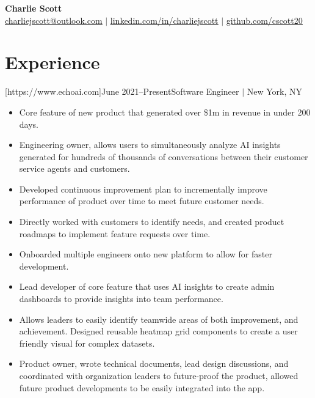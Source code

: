 \documentclass[letterpaper,11pt]{article}
\newcommand{\Item}[1]{
  \item\small{
    \parbox[t]{500pt}{\raggedright#1}
  }
}
\newenvironment{HeadingList}{
  \begin{mdframed}[
    topline=false,
    bottomline=false,
    rightline=false,
    leftline=false,
    linecolor=gray,
    linewidth=0pt,
    leftmargin=0pt,
    innerleftmargin=0pt,
    innertopmargin=0pt,
    innerbottommargin=0pt,
    innerrightmargin=0pt,
    skipabove=\parsep,
    skipbelow=\parsep,
  ]
  \begin{itemize}[leftmargin=0pt, label={}]
}{
  \end{itemize}
  \end{mdframed}
}
\newenvironment{SubHeadingList}{
  \begin{mdframed}[
    leftline=true,
    linecolor=gray,
    linewidth=.5pt,
    leftmargin=8pt,
    innerleftmargin=8pt,
  ]
  \begin{itemize}[leftmargin=0pt, label={}]
}{
  \end{itemize}
  \end{mdframed}
}
\newenvironment{ItemList}{
  \begin{itemize}[itemsep=4pt, topsep=-3pt, partopsep=0pt, parsep=0pt, leftmargin=20pt, label=\raisebox{0.4ex}{\scalebox{0.5}{\textbullet}}]
}{\end{itemize}}
\begin{document}

\begin{center}
    \textbf{\Huge Charlie Scott} \\ \vspace{1pt}
    \href{mailto:charliejscott@outlook.com}{\underline{charliejscott@outlook.com}} $|$
    \href{https://linkedin.com/in/charliejscott}{\underline{linkedin.com/in/charliejscott}} $|$
    \href{https://github.com/cscott20}{\underline{github.com/cscott20}}
\end{center}


\section{Experience}
    \begin{HeadingList}
        [https://www.echoai.com]{June 2021--Present}{Software Engineer $|$ New York, NY}
            \begin{SubHeadingList}

                \begin{ItemList}
                    \Item{Core feature of new product that generated over \$1m in revenue in under 200 days.}
                    \Item{Engineering owner, allows users to simultaneously analyze AI insights generated for hundreds of thousands of conversations between their customer service agents and customers.}
                    \Item{Developed continuous improvement plan to incrementally improve performance of product over time to meet future customer needs.}
                    \Item{Directly worked with customers to identify needs, and created product roadmaps to implement feature requests over time.}
                    \Item{Onboarded multiple engineers onto new platform to allow for faster development.}
                \end{ItemList}

                \begin{ItemList}
                    \Item{Lead developer of core feature that uses AI insights to create admin dashboards to provide insights into team performance.}
                    \Item{Allows leaders to easily identify teamwide areas of both improvement, and achievement. Designed reusable heatmap grid components to create a user friendly visual for complex datasets.}
                    \Item{Product owner, wrote technical documents, lead design discussions, and coordinated with organization leaders to future-proof the product, allowed future product developments to be easily integrated into the app.}
                \end{ItemList}


\end{SubHeadingList}
\end{HeadingList}
\end{document}
